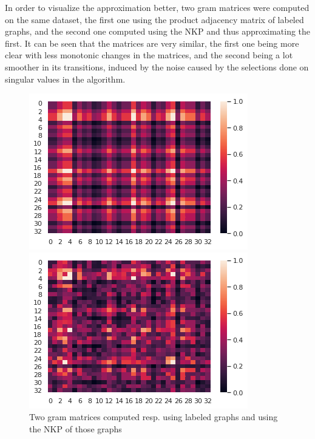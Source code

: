 \documentclass{article}
\theoremstyle{definition}
\begin{document}
In order to visualize the approximation better, two gram matrices were computed on the same dataset, the first one using the product adjacency matrix of labeled graphs, and the second one computed using the NKP and thus approximating the first. It can be seen that the matrices are very similar, the first one being more clear with less monotonic changes in the matrices, and the second being a lot smoother in its transitions, induced by the noise caused by the selections done on singular values in the algorithm.
\begin{figure}[!htb]
	\begin{multicols}{2}
		\includegraphics[width=\linewidth]{data/nkp/gram.png}\par
		\includegraphics[width=\linewidth]{data/nkp/gram_approx.png}\par
	\end{multicols}
\caption{Two gram matrices computed resp. using labeled graphs and using the NKP of those graphs}
\end{figure}
\end{document}
